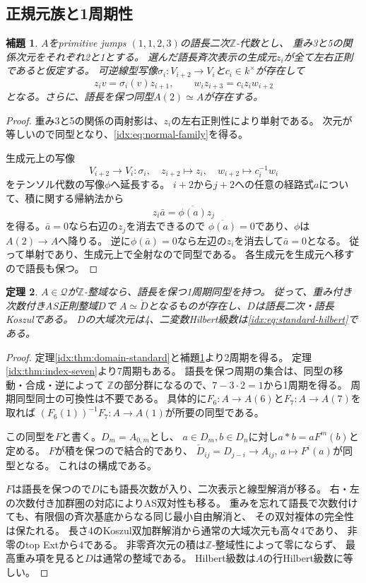 \documentclass[11pt,a4paper]{ltjsarticle}
\newtheorem{theorem}{定理}[section]
\newtheorem{lemma}[theorem]{補題}
\theoremstyle{definition}
\begin{document}
\subsection{正規元族と1周期性}
\begin{lemma}\label{idx:lem:normal-family}
$A$をprimitive jumps $(1,1,2,3)$の語長二次$\mathbb Z$-代数とし、
重み3と5の関係次元をそれぞれ2と1とする。
選んだ語長斉次表示の生成元$z_i$が全て左右正則であると仮定する。
可逆線型写像$\sigma_i:V_{i+2}\to V_i$と$c_i\in k^\times$が存在して
\begin{equation}\label{idx:eq:normal-family}
z_i v=\sigma_i(v)z_{i+1},\qquad
w_i z_{i+3}=c_i z_i w_{i+2}
\end{equation}
となる。さらに、語長を保つ同型$A(2)\simeq A$が存在する。
\end{lemma}
\begin{proof}
重み3と5の関係の両射影は、$z_i$の左右正則性により単射である。
次元が等しいので同型となり、\eqref{idx:eq:normal-family}を得る。

生成元上の写像
\[
V_{i+2}\longrightarrow V_i:\sigma_i,\quad
z_{i+2}\longmapsto z_i,\quad
w_{i+2}\longmapsto c_i^{-1}w_i
\]
をテンソル代数の写像$\phi$へ延長する。
$i+2$から$j+2$への任意の経路式$a$について、積に関する帰納法から
\[
z_i\bar a=\overline{\phi(a)}z_j
\]
を得る。$\bar a=0$なら右辺の$z_j$を消去できるので
$\overline{\phi(a)}=0$であり、$\phi$は$A(2)\to A$へ降りる。
逆に$\phi(\bar a)=0$なら左辺の$z_i$を消去して$\bar a=0$となる。
従って単射であり、生成元上で全射なので同型である。
各生成元を生成元へ移すので語長も保つ。
\end{proof}

\begin{theorem}\label{idx:thm:domain-period-one}
$A\in\mathcal Q$が$\mathbb Z$-整域なら、語長を保つ1周期同型を持つ。
従って、重み付き次数付きAS正則整域$D$で
$A\simeq\check D$となるものが存在し、$D$は語長二次・語長Koszulである。
$D$の大域次元は4、二変数Hilbert級数は\eqref{idx:eq:standard-hilbert}である。
\end{theorem}
\begin{proof}
定理\ref{idx:thm:domain-standard}と補題\ref{idx:lem:normal-family}より2周期を得る。
定理\ref{idx:thm:index-seven}より7周期もある。
語長を保つ周期の集合は、同型の移動・合成・逆によって
$\mathbb Z$の部分群になるので、$7-3\cdot2=1$から1周期を得る。
周期同型同士の可換性は不要である。
具体的に$F_6:A\to A(6)$と$F_7:A\to A(7)$を取れば
$(F_6(1))^{-1}F_7:A\to A(1)$が所要の同型である。

この同型を$F$と書く。$D_m=A_{0,m}$とし、
$a\in D_m,b\in D_n$に対し$a*b=aF^m(b)$と定める。
$F$が積を保つので結合的であり、
$\check D_{ij}=D_{j-i}\to A_{ij}$, $a\mapsto F^i(a)$が同型となる。
これは\cite[Lemma 3.4]{VdB}の構成である。

$F$は語長を保つので$D$にも語長次数が入り、二次表示と線型解消が移る。
右・左の次数付き加群圏の対応によりAS双対性も移る。
重みを忘れて語長で次数付けても、有限個の斉次基底からなる同じ最小自由解消と、
その双対複体の完全性は保たれる。
長さ4のKoszul双加群解消から通常の大域次元も高々4であり、
非零のtop Extから4である。
非零斉次元の積は$\mathbb Z$-整域性によって零にならず、
最高重み項を見ると$D$は通常の整域である。
Hilbert級数は$A$の行Hilbert級数に等しい。
\end{proof}
\end{document}
